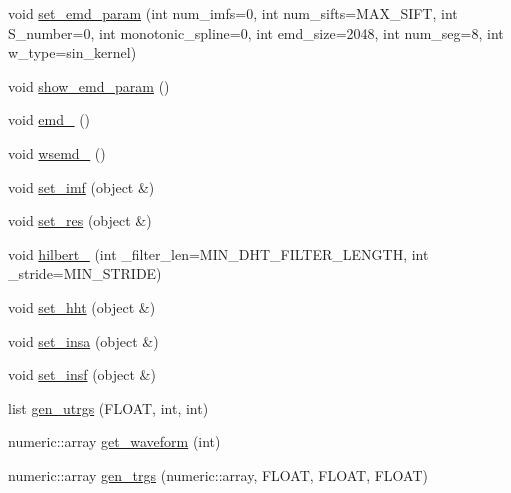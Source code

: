 \begin{DoxyCompactItemize}
\item 
void \hyperlink{classetagen_a910eca05e0ec09ef309761c9cd368f4c}{set\-\_\-emd\-\_\-param} (int num\-\_\-imfs=0, int num\-\_\-sifts=M\-A\-X\-\_\-\-S\-I\-F\-T, int S\-\_\-number=0, int monotonic\-\_\-spline=0, int emd\-\_\-size=2048, int num\-\_\-seg=8, int w\-\_\-type=sin\-\_\-kernel)
\item 
void \hyperlink{classetagen_a31a48ff12f1ea68d7c4d942e04bdf7e4}{show\-\_\-emd\-\_\-param} ()
\item 
void \hyperlink{classetagen_a96a89d06eac778a9804e3c8420b46c7b}{emd\-\_\-} ()
\item 
void \hyperlink{classetagen_ac3577de006721d1d9f64c7c98222be82}{wsemd\-\_\-} ()
\item 
void \hyperlink{classetagen_ad56fc2a5f5a0cf2dc20916d27b9bf64c}{set\-\_\-imf} (object \&)
\item 
void \hyperlink{classetagen_a95cd8c3d51999b0d5d8dc1ed3ed6b2bb}{set\-\_\-res} (object \&)
\item 
void \hyperlink{classetagen_a39b9c052ff247a05156ab9f0b1e8f490}{hilbert\-\_\-} (int \-\_\-filter\-\_\-len=M\-I\-N\-\_\-\-D\-H\-T\-\_\-\-F\-I\-L\-T\-E\-R\-\_\-\-L\-E\-N\-G\-T\-H, int \-\_\-stride=M\-I\-N\-\_\-\-S\-T\-R\-I\-D\-E)
\item 
void \hyperlink{classetagen_a0aa3f4df2dec5c2071712730b91153d3}{set\-\_\-hht} (object \&)
\item 
void \hyperlink{classetagen_ace17478c84198ba8eac49f4290d71b65}{set\-\_\-insa} (object \&)
\item 
void \hyperlink{classetagen_a35bc3abb1d4a49b2f6e88a389627516d}{set\-\_\-insf} (object \&)
\item 
list \hyperlink{classetagen_a49d776b1901bf1d8267e6b64792ee56f}{gen\-\_\-utrgs} (F\-L\-O\-A\-T, int, int)
\item 
numeric\-::array \hyperlink{classetagen_a83edca09f8e18a0cc618f29c1e333a13}{get\-\_\-waveform} (int)
\item 
numeric\-::array \hyperlink{classetagen_af7ace8ea08498fefd814560063e5ea39}{gen\-\_\-trgs} (numeric\-::array, F\-L\-O\-A\-T, F\-L\-O\-A\-T, F\-L\-O\-A\-T)
\end{DoxyCompactItemize}
